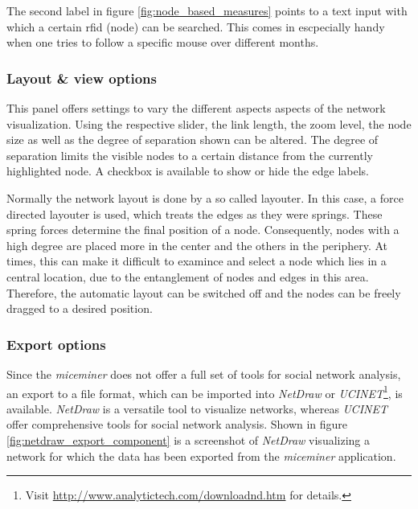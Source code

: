 The second label in figure \ref{fig:node_based_measures} points to a text input with which a certain rfid (node) can be searched. This comes in escpecially handy when one tries to follow a specific mouse over different months.    

\subsubsection*{Layout \& view options}

This panel offers settings to vary the different aspects aspects of the network visualization. Using the respective slider, the link length, the zoom level, the node size as well as the degree of separation shown can be altered. The degree of separation limits the visible nodes to a certain distance from the currently highlighted node. A checkbox is available to show or hide the edge labels.

Normally the network layout is done by a so called layouter. In this case, a force directed layouter is used, which treats the edges as they were springs. These spring forces determine the final position of a node. Consequently, nodes with a high degree are placed more in the center and the others in the periphery. At times, this can make it difficult to examince and select a node which lies in a central location, due to the entanglement of nodes and edges in this area. Therefore, the automatic layout can be switched off and the nodes can be freely dragged to a desired position.

\subsubsection*{Export options}

Since the \textit{miceminer} does not offer a full set of tools for social network analysis, an export to a file format, which can be imported into \textit{NetDraw} or \textit{UCINET}\footnote{Visit \href{http://www.analytictech.com/downloadnd.htm}{http://www.analytictech.com/downloadnd.htm} for details.}, is available. \textit{NetDraw} is a versatile tool to visualize networks, whereas \textit{UCINET} offer comprehensive tools for social network analysis. Shown in figure \ref{fig:netdraw_export_component} is a screenshot of \textit{NetDraw} visualizing a network for which the data has been exported from the \textit{miceminer} application.

